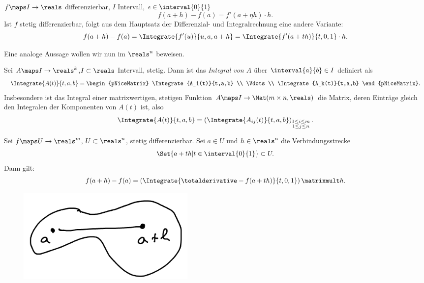 \begin{bemerkung*}
    \( f\maps I\to \reals \) differenzierbar, \( I \) Intervall, \texists \( \epsilon\in \interval{0}{1} \) \sd
    \begin{equation*}
        f(a+h)-f(a)=f'(a+\eta h)\cdot h.
    \end{equation*}
    Ist \( f \) stetig differenzierbar, folgt aus dem Hauptsatz der Differenzial- und Integralrechnung eine andere Variante:
    \begin{equation*}
        f(a+h)-f(a)=\Integrate{f'(u)}{u,a,a+h}=\Integrate{f'(a+th)}{t,0,1}\cdot h.
    \end{equation*}
\end{bemerkung*}
Eine analoge Aussage wollen wir nun im \( \reals^n \) beweisen.
\begin{definition*}
    Sei \( A\maps I\to \reals^k \),\( I\subset \reals \) Intervall, stetig. Dann ist das \emph{Integral von \( A \)} über \( \interval{a}{b}\in I \) definiert als
    \begin{equation*}
        \Integrate{A(t)}{t,a,b}=\begin{pNiceMatrix} \Integrate{A_1(t)}{t,a,b} \\ \Vdots \\ \Integrate{A_k(t)}{t,a,b} \end{pNiceMatrix}.
    \end{equation*}
    Insbesondere ist das Integral einer matrixwertigen, stetigen Funktion \( A\maps I\to \Mat(m\times n,\reals) \) die Matrix, deren Einträge gleich den Integralen der Komponenten von \( A(t) \) ist, also
    \begin{equation*}
        \Integrate{A(t)}{t,a,b}=\left( \Integrate{A_{ij}(t)}{t,a,b} \right)_{\substack{1\leq i\leq m\\1\leq j\leq n}}.
    \end{equation*}
\end{definition*}
\begin{satz}\label{verbindungsstrecke_integral_mws}
    Sei \( f\maps U\to \reals^m \), \( U\subset \reals^n \), stetig differenzierbar. Sei \( a\in U \) und \( h\in \reals^n \) \sd  die Verbindungsstrecke
    \begin{equation*}
        \Set{a+th|t\in \interval{0}{1}}\subset U.
    \end{equation*}
    Dann gilt:
    \begin{equation*}
        f(a+h)-f(a)=\left( \Integrate{\totalderivative-{f}(a+th)}{t,0,1} \right)\matrixmult h.
    \end{equation*}
    \begin{figure}[H]
        \centering
        \includegraphics[width=0.5\linewidth]{figures/mws_integral_verbindungsstrecke}
        \label{fig:mws_integral_verbindungsstrecke}
    \end{figure}
\end{satz}
